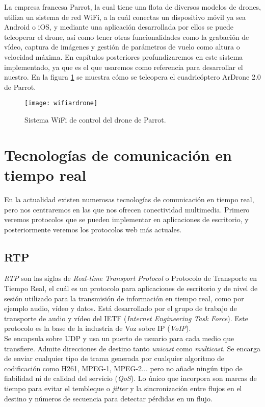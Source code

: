 La empresa francesa Parrot, la cual tiene una flota de diversos modelos de drones, utiliza un sistema de red WiFi, a la cuál conectas un dispositivo móvil ya sea Android o iOS, y mediante una aplicación desarrollada por ellos se puede teleoperar el drone, así como tener otras funcionalidades como la grabación de vídeo, captura de imágenes y gestión de parámetros de vuelo como altura o velocidad máxima. En capítulos posteriores profundizaremos en este sistema implementado, ya que es el que usaremos como referencia para desarrollar el nuestro. En la figura \ref{fig:wifiardrone} se muestra cómo se teleopera el cuadricóptero ArDrone 2.0 de Parrot.\\


\begin{figure}[h!]
\centering
\texttt{[image: wifiardrone]}
\caption{Sistema WiFi de control del drone de Parrot.}
\label{fig:wifiardrone}
\end{figure}


\section{Tecnologías de comunicación en tiempo real}

En la actualidad  existen numerosas tecnologías de comunicación en tiempo real, pero nos centraremos en las que nos ofrecen conectividad multimedia. Primero veremos protocolos que se pueden implementar en aplicaciones de escritorio, y posteriormente veremos los protocolos web más actuales.\\

\subsection{RTP}

\emph{RTP} son las siglas de \emph{Real-time Transport Protocol} o Protocolo de Transporte en Tiempo Real, el cuál es un protocolo para aplicaciones de escritorio y de nivel de sesión utilizado para la transmisión de información en tiempo real, como por ejemplo audio, vídeo y datos. Está desarrollado por el grupo de trabajo de transporte de audio y vídeo del IETF (\emph{Internet Engineering Task Force}). Este protocolo es la base de la industria de Voz sobre IP (\emph{VoIP}).\\

Se encapsula sobre UDP y usa un puerto de usuario para cada medio que transfiere. Admite direcciones de destino tanto \emph{unicast} como \emph{multicast}. Se encarga de enviar cualquier tipo de trama generada por cualquier algoritmo de codificación como H261, MPEG-1, MPEG-2... pero no añade ningún tipo de fiabilidad ni de calidad del servicio (\emph{QoS}). Lo único que incorpora son marcas de tiempo para evitar el tembleque o \emph{jitter} y la sincronización entre flujos en el destino y números de secuencia para detectar pérdidas en un flujo.\\

